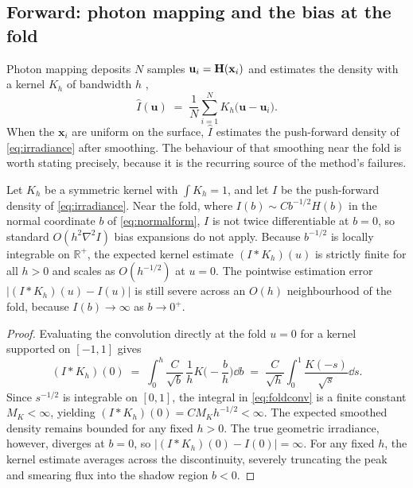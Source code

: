 \subsection{Forward: photon mapping and the bias at the fold}
\label{sec:photonmap}

Photon mapping deposits $N$ samples $\mathbf{u}_i = \mathbf{H}(\mathbf{x}_i)$ and
estimates the density with a kernel $K_h$ of bandwidth $h$ \cite{silverman1986},
\begin{equation}
\hat I(\mathbf{u}) \;=\; \frac{1}{N} \sum_{i=1}^{N}
K_h\!\big(\mathbf{u} - \mathbf{u}_i\big).
\label{eq:kde}
\end{equation}
When the $\mathbf{x}_i$ are uniform on the surface, $\hat I$ estimates the
push-forward density of \eqref{eq:irradiance} after smoothing. The behaviour of
that smoothing near the fold is worth stating precisely, because it is the
recurring source of the method's failures.

\begin{lemma}
\label{lem:kdebias}
Let $K_h$ be a symmetric kernel with $\int K_h = 1$, and let $I$ be the
push-forward density of \eqref{eq:irradiance}. Near the fold, where
$I(b) \sim C b^{-1/2} H(b)$ in the normal coordinate $b$ of \eqref{eq:normalform},
$I$ is not twice differentiable at $b=0$, so standard $O(h^2 \nabla^2 I)$ bias
expansions do not apply. Because $b^{-1/2}$ is locally integrable on $\mathbb{R}^+$,
the expected kernel estimate $(I * K_h)(u)$ is strictly finite for all $h > 0$
and scales as $O(h^{-1/2})$ at $u=0$. The pointwise estimation error
$|(I * K_h)(u) - I(u)|$ is still severe across an $O(h)$ neighbourhood of the
fold, because $I(b) \to \infty$ as $b \to 0^+$.
\end{lemma}

\begin{proof}
Evaluating the convolution directly at the fold $u=0$ for a kernel supported on $[-1,1]$ gives
\begin{equation}
(I * K_h)(0) \;=\; \int_{0}^{h} \frac{C}{\sqrt{b}}\,\frac{1}{h} K\!\Big(-\frac{b}{h}\Big)\dd b
\;=\; \frac{C}{\sqrt{h}} \int_{0}^{1} \frac{K(-s)}{\sqrt{s}}\dd s.
\label{eq:foldconv}
\end{equation}
Since $s^{-1/2}$ is integrable on $[0,1]$, the integral in \eqref{eq:foldconv} is a
finite constant $M_K < \infty$, yielding $(I * K_h)(0) = C M_K h^{-1/2} < \infty$.
The expected smoothed density remains bounded for any fixed $h > 0$. The true
geometric irradiance, however, diverges at $b = 0$, so $|(I * K_h)(0) - I(0)| = \infty$.
For any fixed $h$, the kernel estimate averages across the discontinuity, severely
truncating the peak and smearing flux into the shadow region $b < 0$.
\end{proof}

